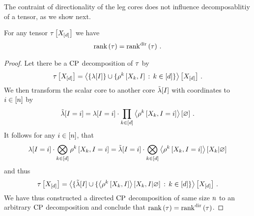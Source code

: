
The contraint of directionality of the leg cores does not influence decomposablitiy of a tensor, as we show next.

\begin{lemma}
    \label{lem:cprankEqualsDir}
    For any tensor $\tau\left[X_{[d]}\right]$ we have
    \begin{align*}
        \mathrm{rank}\left(\tau\right) = \mathrm{rank}^{\mathrm{dir}}\left(\tau\right) \, .
    \end{align*}
\end{lemma}
\begin{proof}
    Let there be a $\mathrm{CP}$ decomposition of $\tau$ by
    \begin{align*}
        \tau\left[X_{[d]}\right]
        = \left\langle 
            \{\lambda[I]\} \cup \{ \rho^{k}\left[X_{k},I\right] \,:\, k\in[d] \}
        \right\rangle \left[ X_{[d]} \right] \, .
    \end{align*}
    We then transform the scalar core to another core $\tilde{\lambda}[I]$ with coordinates to $i\in[n]$ by
    \begin{align*}
        \tilde{\lambda}[I=i]
        = \lambda[I=i] \cdot \prod_{k\in[d]} \left\langle \rho^{k}\left[X_{k},I=i\right]\right\rangle \left[ \varnothing \right] \, .
    \end{align*}
    It follows for any $i\in[n]$, that
    \begin{align*}
        \lambda[I=i] \cdot \bigotimes_{k\in[d]}\rho^{k}\left[X_{k},I=i\right]
        = \tilde{\lambda}[I=i] \cdot \bigotimes_{k\in[d]}\left\langle \rho^{k}\left[X_{k},I=i\right]\right\rangle \left[ X_{k} | \varnothing \right]
    \end{align*}
    and thus
    \begin{align*}
        \tau\left[X_{[d]}\right]
        = \left\langle 
            \{\tilde{\lambda}[I] \cup \{ \left\langle \rho^{k}\left[X_{k},I\right]\right\rangle \left[ X_{k},I | \varnothing \right] \,:\, k\in[d] \}
        \right\rangle \left[ X_{[d]} \right] \, .
    \end{align*}
    We have thus constructed a directed $\mathrm{CP}$ decomposition of same size $n$ to an arbitrary $\mathrm{CP}$ decomposition and conclude that $\mathrm{rank}\left(\tau\right) = \mathrm{rank}^{\mathrm{dir}}\left(\tau\right)$.
\end{proof}

